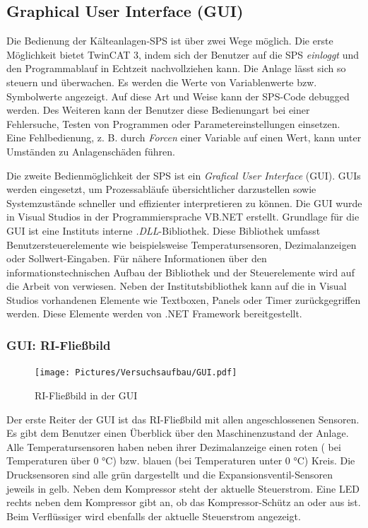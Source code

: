 \subsection{Graphical User Interface (GUI)}
\label{subsec:GUI}

Die Bedienung der Kälteanlagen-SPS ist über zwei Wege möglich. Die erste Möglichkeit bietet TwinCAT 3, indem sich der Benutzer auf die SPS \textit{einloggt} und den Programmablauf in Echtzeit nachvollziehen kann. Die Anlage lässt sich so steuern und überwachen. Es werden die Werte von Variablenwerte bzw. Symbolwerte angezeigt. Auf diese Art und Weise kann der SPS-Code debugged werden. 
Des Weiteren kann der Benutzer diese Bedienungart bei einer Fehlersuche, Testen von Programmen oder Parametereinstellungen einsetzen. 
Eine Fehlbedienung, z. B. durch \textit{Forcen} einer Variable auf einen Wert, kann unter Umständen zu Anlagenschäden führen. 

Die zweite Bedienmöglichkeit der SPS ist ein \textit{Grafical User Interface} (GUI). GUIs werden eingesetzt, um Prozessabläufe übersichtlicher darzustellen sowie Systemzustände schneller und effizienter interpretieren zu können. Die GUI wurde in Visual Studios in der Programmiersprache VB.NET erstellt. Grundlage für die GUI ist eine Instituts interne \textit{.DLL}-Bibliothek. Diese Bibliothek umfasst Benutzersteuerelemente wie beispielsweise Temperatursensoren, Dezimalanzeigen oder Sollwert-Eingaben. Für nähere Informationen über den informationstechnischen Aufbau der Bibliothek und der Steuerelemente wird auf die Arbeit von \citep{Nuerenberg2015} verwiesen. 
Neben der Institutsbibliothek kann auf die in Visual Studios vorhandenen Elemente wie Textboxen, Panels oder Timer zurückgegriffen werden. Diese Elemente werden von .NET Framework bereitgestellt.  

\subsubsection*{GUI: RI-Fließbild}

\begin{figure}[htb]
\centering		\texttt{[image: Pictures/Versuchsaufbau/GUI.pdf]}
\caption{RI-Fließbild in der GUI}
\label{fig:RI}
\end{figure}

Der erste Reiter der GUI ist das RI-Fließbild mit allen angeschlossenen Sensoren. Es gibt dem Benutzer einen Überblick über den Maschinenzustand der Anlage. Alle Temperatursensoren haben neben ihrer Dezimalanzeige einen roten ( bei Temperaturen über 0 °C) bzw. blauen (bei Temperaturen unter 0 °C) Kreis. Die Drucksensoren sind alle grün dargestellt und die Expansionsventil-Sensoren jeweils in gelb. Neben dem Kompressor steht der aktuelle Steuerstrom. Eine LED rechts neben dem Kompressor gibt an, ob das Kompressor-Schütz an oder aus ist. 
Beim Verflüssiger wird ebenfalls der aktuelle Steuerstrom angezeigt. 

